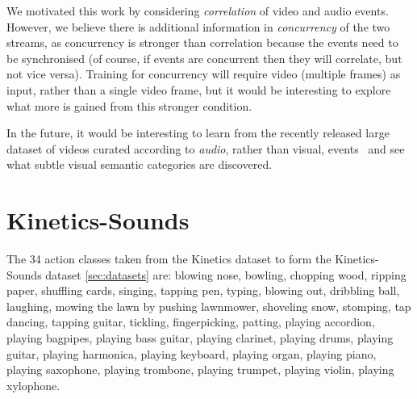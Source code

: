 \documentclass[10pt,twocolumn,letterpaper]{article}
\begin{document}
We motivated this work by considering {\em correlation} of video and audio
events. However, we believe there is additional information in \emph{concurrency}
of the two streams, as concurrency is stronger than correlation
because the events need to be
synchronised (of course, if events are concurrent then they will
correlate, but not vice versa). Training for concurrency will require
video (multiple frames) as input, rather than a single video frame,
but it would be interesting to explore what more is gained from this
stronger condition.

%
%
%
In the future,
it would be interesting to learn
from the recently released large dataset of videos curated according to
{\em audio}, rather than visual, events~\cite{Gemmeke17} and see what subtle
visual semantic categories are discovered.
%


%
%
{\small


}

\appendix
\section{Kinetics-Sounds}
\label{sec:kineticssounds}
The 34 action classes taken from the Kinetics dataset \cite{Kay17} to form
the Kinetics-Sounds dataset \ref{sec:datasets} are:
blowing nose,
bowling,
chopping wood,
ripping paper,
shuffling cards,
singing,
tapping pen,
typing,
blowing out,
dribbling ball,
laughing,
mowing the lawn by pushing lawnmower,
shoveling snow,
stomping,
tap dancing,
tapping guitar,
tickling,
fingerpicking,
patting,
playing accordion,
playing bagpipes,
playing bass guitar,
playing clarinet,
playing drums,
playing guitar,
playing harmonica,
playing keyboard,
playing organ,
playing piano,
playing saxophone,
playing trombone,
playing trumpet,
playing violin,
playing xylophone.
\end{document}

